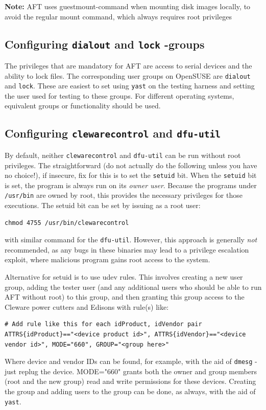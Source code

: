 \documentclass[a4paper,11pt]{article}
\newcommand{\note}{\textbf{Note: }}
\newcommand{\cmd}[1]{\texttt{#1}}
\begin{document}
\note AFT uses guestmount-command when mounting disk images locally, to avoid the regular mount command, which always requires root privileges

\subsection*{Configuring \cmd{dialout} and \cmd{lock} -groups}

The privileges that are mandatory for AFT are access to serial devices and the ability to lock files. The corresponding user groups on OpenSUSE are \cmd{dialout} and \cmd{lock}. These are easiest to set using \cmd{yast} on the testing harness and setting the user used for testing to these groups.
For different operating systems, equivalent groups or functionality should be used.

\subsection*{Configuring \cmd{clewarecontrol} and \cmd{dfu-util}}
By default, neither \cmd{clewarecontrol} and \cmd{dfu-util} can be run without root privileges. The straightforward (do not actually do the following unless you have no choice!), if insecure, fix for this is to set the \cmd{setuid} bit. When the \cmd{setuid} bit is set, the program is always run on its \emph{owner user}. Because the programs under \cmd{/usr/bin} are owned by root, this provides the necessary privileges for those executions. The setuid bit can be set by issuing as a root user:
\begin{lstlisting}
chmod 4755 /usr/bin/clewarecontrol
\end{lstlisting}
with similar command for the \cmd{dfu-util}. However, this approach is generally \emph{not} recommended, as any bugs in these binaries may lead to a privilege escalation exploit, where malicious program gains root access to the system.

Alternative for setuid is to use udev rules. This involves creating a new user group, adding the tester user (and any additional users who should be able to run AFT without root) to this group, and then granting this group access to the Cleware power cutters and Edisons with rule(s) like:

\begin{lstlisting}
# Add rule like this for each idProduct, idVendor pair
ATTRS{idProduct}=="<device product id>", ATTRS{idVendor}=="<device vendor id>", MODE="660", GROUP="<group here>"
\end{lstlisting}
Where device and vendor IDs can be found, for example, with the aid of \cmd{dmesg} - just replug the device. MODE="660" grants both the owner and group members (root and the new group) read and write permissions for these devices. Creating the group and adding users to the group can be done, as always, with the aid of \cmd{yast}.
\end{document}
